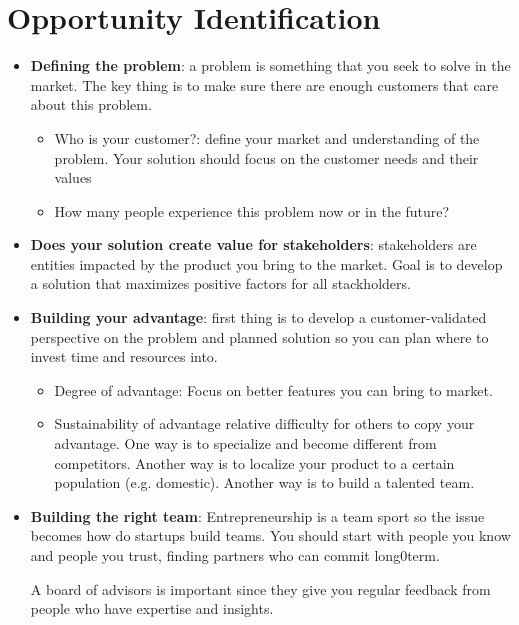 \documentclass{article}
\begin{document}
  \section{Opportunity Identification}
  \begin{itemize}
    \item \textbf{Defining the problem}: a problem is something that you seek to solve in the market. The key thing is to make sure there are enough customers that care about this problem.
    \begin{itemize}
      \item Who is your customer?: define your market and understanding of the problem. Your solution should focus on the customer needs and their values
      \item How many people experience this problem now or in the future?
      \end{itemize}
    \item \textbf{Does your solution create value for stakeholders}: stakeholders are entities impacted by the product you bring to the market. Goal is to develop a solution that maximizes positive factors for all stackholders.
    \item \textbf{Building your advantage}: first thing is to develop a customer-validated perspective on the problem and planned solution so you can plan where to invest time and resources into.
      \begin{itemize}
        \item Degree of advantage: Focus on better features you can bring to market.
        \item Sustainability of advantage relative difficulty for others to copy your advantage. One way is to specialize and become different from competitors. Another way is to localize your product to a certain population (e.g. domestic). Another way is to build a talented team.
      \end{itemize}
    \item \textbf{Building the right team}: Entrepreneurship is a team sport so the issue becomes how do startups build teams. You should start with people you know and people you trust, finding partners who can commit long0term.

      A board of advisors is important since they give you regular feedback from people who have expertise and insights.
  \end{itemize}
\end{document}
